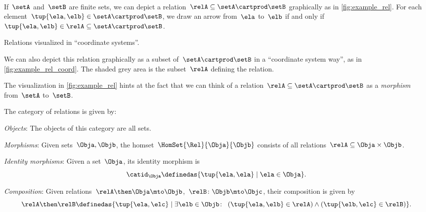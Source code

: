 \


\begin{marginfigure}
  \centering
  \caption{}
  \label{fig:example_rel}
\end{marginfigure}

If~$\setA$ and~$\setB$ are finite sets, we can depict a relation~$\relA \subseteq \setA \cartprod \setB$ graphically as in \cref{fig:example_rel}. For each element~$\tup{\ela,\elb} \in \setA \cartprod \setB$, we draw an arrow from~$\ela$ to~$\elb$ if and only if~$\tup{\ela,\elb} \in \relA \subseteq \setA \cartprod \setB$.


\begin{marginfigure}
  \begin{center}
  \end{center}
  \caption{Relations visualized in ``coordinate systems''.}
  \label{fig:example_rel_coord}
\end{marginfigure}

We can also depict this relation graphically as a subset of~$\setA \cartprod \setB$ in a ``coordinate system way'', as in \cref{fig:example_rel_coord}. The shaded grey area is the subset~$\relA$ defining the relation.



The visualization in \cref{fig:example_rel} hints at the fact that we can think of a relation~$\relA \subseteq \setA \cartprod \setB$ as a \emph{morphism} from~$\setA$ to~$\setB$.

\begin{ctdefinition}
  \label{def:Rel}
  The category of relations \iindex{\Rel}  is given by:
  \begin{compactenum}
    \item \emph{Objects}: The objects of this category are all sets.
    \item \emph{Morphisms}: Given sets~$\Obja, \Objb$, the homset~$\HomSet{\Rel}{\Obja}{\Objb}$ consists of all
    relations~$\relA\subseteq \Obja\times \Objb$.
    \item \emph{Identity morphisms}: Given a set~$\Obja$, its identity morphism is
    \begin{equation}
      \catid_\Obja \definedas \{ \tup{\ela,\ela} \mid  \ela \in \Obja \}.
    \end{equation}
    \item \emph{Composition}: Given relations~$\relA \then \Obja\mto \Objb$,~$\relB \colon \Objb\mto \Objc$, their composition is given by
    \begin{equation}
      \label{eq:RelCompRule}
      \relA \then \relB \definedas \{\tup{\ela,\elc} \mid  \exists \elb \in \Objb \colon \ \left(\tup{\ela,\elb} \in \relA\right) \wedge \left(\tup{\elb,\elc} \in \relB\right)\}.
    \end{equation}
  \end{compactenum}
\end{ctdefinition}

